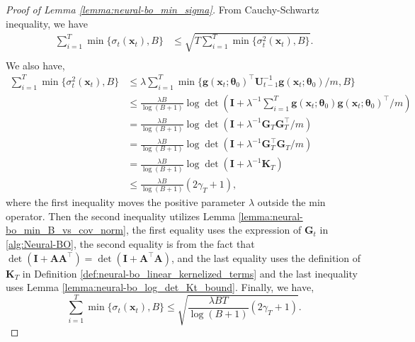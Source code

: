 \begin{proof}[Proof of Lemma \ref{lemma:neural-bo_min_sigma}]

From Cauchy-Schwartz inequality, we have 
\begin{equation*}
    \begin{split}
        \sum_{i=1}^T \min \{\sigma_t(\mathbf{x}_t), B\} & \leq \sqrt{T \sum_{i=1}^T \min \{\sigma_t^2(\mathbf{x}_t), B\}}. \\
    \end{split}
\end{equation*}
We also have, 
\begin{equation*}
    \begin{split}
        \sum_{i=1}^T \min \{\sigma_t^2 (\mathbf{x}_t), B\} & \leq \lambda \sum_{i=1}^T \min \{ \mathbf{g}(\mathbf{x}_t;\boldsymbol{\theta}_0)^\top \mathbf{U}^{-1}_{t-1} \mathbf{g}(\mathbf{x}_t;\boldsymbol{\theta}_0)/m,B \} 
        \\
        & \leq \frac{\lambda B}{\log(B+1)}  \log \det (\mathbf{I} + \lambda^{-1} \sum_{i=1}^T \mathbf{g}(\mathbf{x}_t;\boldsymbol{\theta}_0) \mathbf{g}(\mathbf{x}_t;\boldsymbol{\theta}_0)^\top /m) \\
        & = \frac{\lambda B}{\log(B+1)}  \log \det (\mathbf{I}  + \lambda^{-1} \mathbf{G}_T \mathbf{G}_T^\top /m ) \\
        & = \frac{\lambda B}{\log(B+1)}\log \det (\mathbf{I}  + \lambda^{-1} \mathbf{G}_T^\top \mathbf{G}_T /m ) \\
        & = \frac{\lambda B}{\log(B+1)} \log \det (\mathbf{I}  + \lambda^{-1} \mathbf{K}_T)\\
        & \leq  \frac{\lambda B}{\log(B+1)} (2\gamma_T+1),
    \end{split}
\end{equation*}
where the first inequality moves the positive parameter $\lambda$ outside the min operator. Then the second inequality utilizes Lemma \ref{lemma:neural-bo_min_B_vs_cov_norm}, the first equality uses the expression of $\mathbf{G}_t$ in \ref{alg:Neural-BO}, the second equality is from the fact that $\det(\mathbf{I} + \mathbf{A}\mathbf{A}^\top) = \det(\mathbf{I} + \mathbf{A}^\top\mathbf{A})$, and the last equality uses the definition of $\mathbf{K}_T$ in Definition \ref{def:neural-bo_linear_kernelized_terms} and the last inequality uses Lemma \ref{lemma:neural-bo_log_det_Kt_bound}. Finally, we have, 
\[
\sum_{i=1}^T \min \{\sigma_t(\mathbf{x}_t), B\} \leq \sqrt{\frac{\lambda BT}{\log(B+1)} (2\gamma_T+1)}.
\]
\end{proof}

